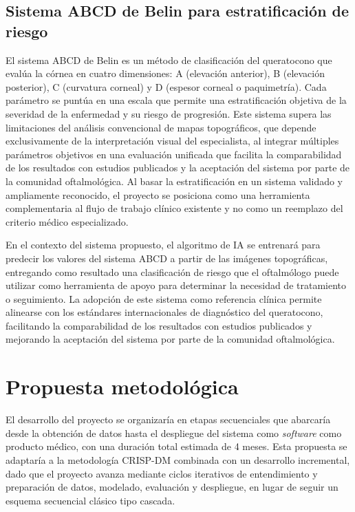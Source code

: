    \subsection{Sistema ABCD de Belin para estratificación de riesgo}

        El sistema ABCD de Belin es un método de clasificación del queratocono que evalúa la córnea en cuatro dimensiones: A (elevación anterior), B (elevación posterior), C (curvatura corneal) y D (espesor corneal o paquimetría). Cada parámetro se puntúa en una escala que permite una estratificación objetiva de la severidad de la enfermedad y su riesgo de progresión. Este sistema supera las limitaciones del análisis convencional de mapas topográficos, que depende exclusivamente de la interpretación visual del especialista, al integrar múltiples parámetros objetivos en una evaluación unificada que facilita la comparabilidad de los resultados con estudios publicados y la aceptación del sistema por parte de la comunidad oftalmológica. Al basar la estratificación en un sistema validado y ampliamente reconocido, el proyecto se posiciona como una herramienta complementaria al flujo de trabajo clínico existente y no como un reemplazo del criterio médico especializado.

        En el contexto del sistema propuesto, el algoritmo de IA se entrenará para predecir los valores del sistema ABCD a partir de las imágenes topográficas, entregando como resultado una clasificación de riesgo que el oftalmólogo puede utilizar como herramienta de apoyo para determinar la necesidad de tratamiento o seguimiento. La adopción de este sistema como referencia clínica permite alinearse con los estándares internacionales de diagnóstico del queratocono, facilitando la comparabilidad de los resultados con estudios publicados y mejorando la aceptación del sistema por parte de la comunidad oftalmológica.

\clearpage
{}
\section{Propuesta metodológica}

    El desarrollo del proyecto se organizaría en etapas secuenciales que abarcaría desde la obtención de datos hasta el despliegue del sistema como \textit{software} como producto médico, con una duración total estimada de 4 meses. Esta propuesta se adaptaría a la metodología CRISP-DM combinada con un desarrollo incremental, dado que el proyecto avanza mediante ciclos iterativos de entendimiento y preparación de datos, modelado, evaluación y despliegue, en lugar de seguir un esquema secuencial clásico tipo cascada.

